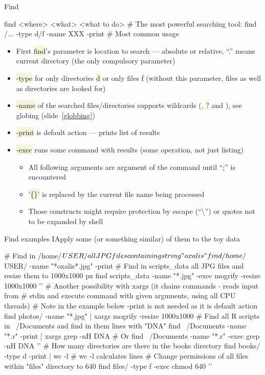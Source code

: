 \documentclass[compress, ucs, xelatex, 11pt, xcolor=svgnames, aspectratio=169,
	hyperref={
		bookmarks=true,
		unicode=true,
		colorlinks=true,
		pdftitle={Linux, command line and MetaCentrum},
		plainpages=false,
		pdfauthor={Vojtech Zeisek},
		pdfsubject={Course about use of Linux command line, writing shell scripts and using MetaCentrum of CESNET},
		pdfcreator={XeLaTeX},
		pdfkeywords={Linux, GNU, BASH, shell, command line, MetaCentrum},
		linkcolor=DarkRed, %
		anchorcolor=DarkBlue, %
		citecolor=Indigo, %
		filecolor=NavyBlue, %
		menucolor=DarkMagenta, %
		urlcolor=DarkBlue, %
		pdftex},
	url={hyphens, lowtilde} %
	]{beamer}
\renewcommand{\texttt}[1]{\colorbox{Beige}{{\ttfamily #1}}}
\begin{document}
\begin{frame}[fragile]{Find}
	\begin{bashcode}
    find <where> <what> <what to do> # The most powerful searching tool:
    find /... -type d/f -name XXX -print # Most common usage
	\end{bashcode}
	\begin{itemize}
		\item First \texttt{find}'s parameter is location to search --- absolute or relative, \enquote{\texttt{.}} means current directory (the only compulsory parameter)
		\item \texttt{-type} for only directories \texttt{d} or only files \texttt{f} (without this parameter, files as well as directories are looked for)
		\item \texttt{-name} of the searched files/directories supports wildcards (\texttt{*}, \texttt{?} and \texttt{[\ldots]}), see globing (slide~\ref{globbing})
		\item \texttt{-print} is default action --- prints list of results
		\item \texttt{-exec} runs some command with results (some operation, not just listing)
		\begin{itemize}
			\item All following arguments are argument of the command until \enquote{\texttt{;}} is encountered
			\item \texttt{'\{\}'} is replaced by the current file name being processed
			\item Those constructs might require protection by escape (\enquote{\textbackslash}) or quotes not to be expanded by shell
		\end{itemize}
	\end{itemize}
\end{frame}

\begin{frame}[fragile]{Find examples I}{Apply some (or something similar) of them to the toy data}
	\begin{bashcode}
    # Find in /home/$USER/ all JPG files containing string "oxalis"
    find /home/$USER/ -name "*oxalis*.jpg" -print
    # Find in scripts_data all JPG files and resize them to 1000x1000 px
    find scripts_data -name "*.jpg" -exec mogrify -resize 1000x1000 '{}' \;
    # Another possibility with xargs (it chains commands - reads input from
    # stdin and execute command with given arguments, using all CPU threads)
    # Note in the example below -print is not needed as it is default action
    find photos/ -name "*.jpg" | xargs mogrify -resize 1000x1000
    # Find all R scripts in ~/Documents and find in them lines with "DNA"
    find ~/Documents -name "*.r" -print | xargs grep -nH DNA # Or
    find ~/Documents -name "*.r" -exec grep -nH DNA '{}' \;
    # How many directories are there in the books directory
    find books/ -type d -print | wc -l # wc -l calculates lines
    # Change permissions of all files within "files" directory to 640
    find files/ -type f -exec chmod 640 '{}' \;
	\end{bashcode}
\end{frame}
\end{document}
